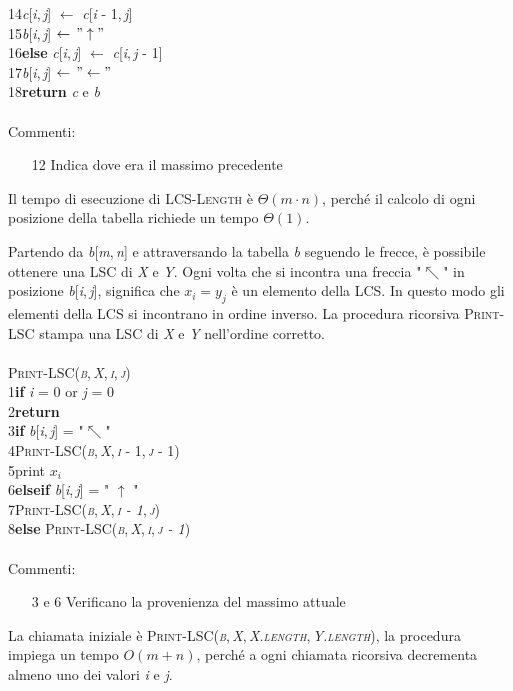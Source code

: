 \documentclass[10pt, a4paper]{report}
\newcommand\firsttab[1][0.5cm]{\hspace*{#1}}
\newcommand\secondtab[1][1cm]{\hspace*{#1}}
\newcommand\thirdtab[1][1.5cm]{\hspace*{#1}}
\newcommand\fourthtab[1][2cm]{\hspace*{#1}}
\begin{document}
14\fourthtab\textit{c}[\textit{i},\,\textit{j}] $\leftarrow$ \textit{c}[\textit{i} - 1,\,\textit{j}]\\
15\fourthtab\textit{b}[\textit{i},\,\textit{j}] $\leftarrow \,"\uparrow"$\\
16\thirdtab\textbf{else} \textit{c}[\textit{i},\,\textit{j}] $\leftarrow$ \textit{c}[\textit{i},\,\textit{j} - 1]\\
17\fourthtab\textit{b}[\textit{i},\,\textit{j}] $\leftarrow \,"\leftarrow"$\\
18\firsttab\textbf{return} \textit{c} e \textit{b}\\\\
Commenti:
\begin{enumerate}
\item[12]Indica dove era il massimo precedente
\end{enumerate}
Il tempo di esecuzione di \textsc{LCS-Length} è $\Theta(m\cdot n)$, perché il calcolo di ogni posizione della tabella richiede un tempo $\Theta(1)$.

Partendo da \textit{b}[\textit{m},\,\textit{n}] e attraversando la tabella  \textit{b} seguendo le frecce, è possibile ottenere una LSC di \textit{X} e \textit{Y}. Ogni volta che si incontra una freccia "$\nwarrow$" in posizione \textit{b}[\textit{i},\,\textit{j}], significa che $x_i = y_j$ è un elemento della LCS. In questo modo gli elementi della LCS si incontrano in ordine inverso. La procedura ricorsiva \textsc{Print-LSC} stampa una LSC di \textit{X} e \textit{Y} nell'ordine corretto.\\\\
\textsc{Print-LSC(\textit{b},\,\textit{X},\,\textit{i},\,\textit{j})}\\
1\firsttab\textbf{if} \textit{i} = 0 or \textit{j} = 0\\
2\secondtab\textbf{return}\\
3\firsttab\textbf{if} \textit{b}[\textit{i},\,\textit{j}] = "$\nwarrow$"\\
4\secondtab\textsc{Print-LSC(\textit{b},\,\textit{X},\,\textit{i} - 1,\,\textit{j} - 1)}\\
5\secondtab print $x_i$\\
6\firsttab\textbf{elseif} \textit{b}[\textit{i},\,\textit{j}] = " $\uparrow$ "\\
7\secondtab\textsc{Print-LSC(\textit{b},\,\textit{X},\,\textit{i - 1},\,\textit{j})}\\
8\firsttab\textbf{else} \textsc{Print-LSC(\textit{b},\,\textit{X},\,\textit{i},\,\textit{j - 1})}\\\\
Commenti:
\begin{enumerate}
\item[3 e 6]Verificano la provenienza del massimo attuale
\end{enumerate}
La chiamata iniziale è \textsc{Print-LSC(\textit{b},\,\textit{X},\,\textit{X.length},\,\textit{Y.length})}, la procedura impiega un tempo $O(m + n)$, perché a ogni chiamata ricorsiva decrementa almeno uno dei valori \textit{i} e \textit{j}.
\end{document}
